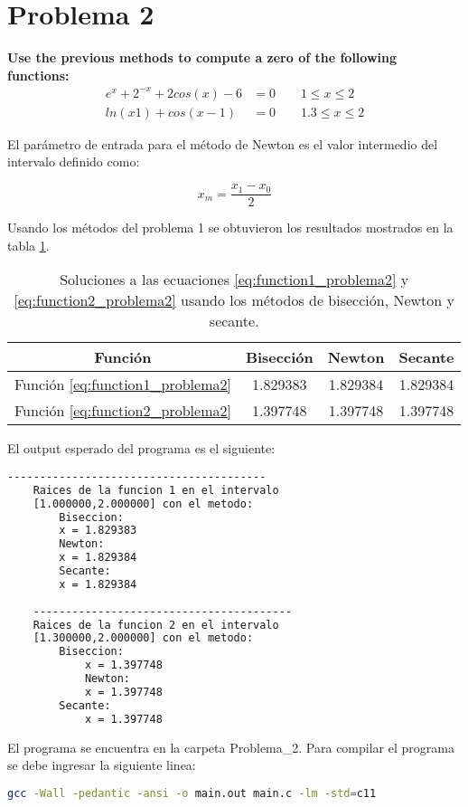 \section*{Problema 2}
\textbf{Use the previous methods to compute a zero of the following functions:}
\begin{align}
    e^x+2^{-x} + 2cos(x) - 6 & =0  \qquad 1\leq   x \leq 2  \label{eq:function1_problema2} \\
    ln(x1)+cos(x-1)          & =0  \qquad 1.3\leq x \leq 2 \label{eq:function2_problema2}
\end{align}

El parámetro de entrada para el método de Newton es el valor intermedio del intervalo definido como:

\begin{equation*}
    x_{m}= \frac{x_1-x_0}{2}
\end{equation*}

Usando los métodos del problema 1 se obtuvieron los resultados mostrados en la tabla \ref{table:solutions_problema2}.

\begin{table}[H]
    \centering
    \begin{tabular}{cccc} \hline
        \textbf{Función}                     & \textbf{Bisección} & \textbf{Newton} & \textbf{Secante} \\ \hline
        Función \ref{eq:function1_problema2} & 1.829383           & 1.829384        & 1.829384         \\
        Función \ref{eq:function2_problema2} & 1.397748           & 1.397748        & 1.397748         \\ \hline
    \end{tabular}
    \caption{Soluciones a las ecuaciones \ref{eq:function1_problema2} y \ref{eq:function2_problema2} usando los métodos de bisección, Newton y secante.}
    \label{table:solutions_problema2}
\end{table}


El output esperado del programa es el siguiente:
\begin{lstlisting}[language=bash]
    ----------------------------------------
    Raices de la funcion 1 en el intervalo
    [1.000000,2.000000] con el metodo:
        Biseccion:
        x = 1.829383
        Newton:
        x = 1.829384
        Secante:
        x = 1.829384
    
    ----------------------------------------
    Raices de la funcion 2 en el intervalo
    [1.300000,2.000000] con el metodo:
        Biseccion:
            x = 1.397748
            Newton:
            x = 1.397748
        Secante:
            x = 1.397748
\end{lstlisting}
El programa se encuentra en la carpeta \textcolor{citecolor}{Problema\_2}. Para compilar el programa se debe ingresar la siguiente linea:

\begin{lstlisting}[language=bash]
    gcc -Wall -pedantic -ansi -o main.out main.c -lm -std=c11    
\end{lstlisting}
